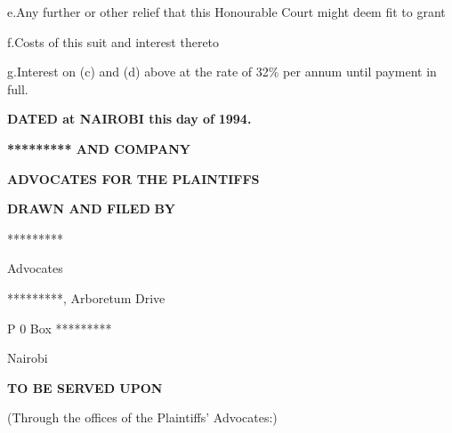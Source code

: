 \documentclass[12pt,a4paper]{article}
\begin{document}
\begin{justify}e.Any further or other relief that this Honourable Court might deem fit to grant\end{justify}


\begin{justify}f.Costs of this suit and interest thereto\end{justify}


\begin{justify}g.Interest on (c) and (d)\textbf{ }above at the rate of 32\% per annum until payment in full.\end{justify}


\begin{justify}\textbf{DATED at NAIROBI this}            \textbf{day of}                    \textbf{1994.}\end{justify}


\begin{flushleft}\textbf{********* AND COMPANY}\end{flushleft}


\begin{flushleft}\textbf{ADVOCATES FOR THE PLAINTIFFS}\end{flushleft}


\begin{flushleft}\textbf{DRAWN AND FILED} \textbf{BY}\end{flushleft}


\begin{flushleft}*********\end{flushleft}


\begin{flushleft}Advocates\end{flushleft}


\begin{flushleft}*********, Arboretum Drive\end{flushleft}


\begin{flushleft}P 0 Box *********\end{flushleft}


\begin{flushleft}Nairobi\end{flushleft}


\begin{flushleft}\textbf{TO BE SERVED UPON}\end{flushleft}


\begin{flushleft}(Through the offices of the Plaintiffs' Advocates:)\end{flushleft}
\end{document}
